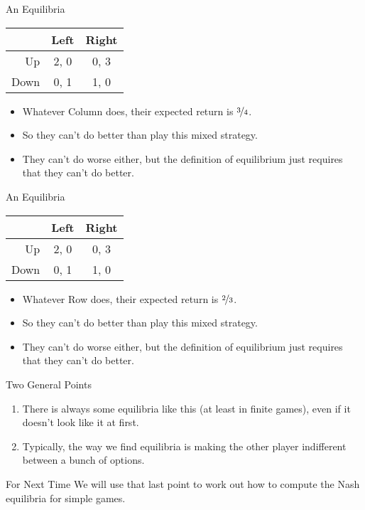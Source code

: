 \documentclass[
  ignorenonframetext,
]{beamer}
\providecommand{\tightlist}{%
  \setlength{\itemsep}{0pt}\setlength{\parskip}{0pt}}
\begin{document}
\begin{frame}{An Equilibria}
\protect\hypertarget{an-equilibria-1}{}
\begin{table}[!h]
\centering
\begin{tabular}[t]{>{}r|cc}
\toprule
 & Left & Right\\
\midrule
Up & 2, 0 & 0, 3\\
Down & 0, 1 & 1, 0\\
\bottomrule
\end{tabular}
\end{table}

\begin{itemize}
\tightlist
\item
  Whatever Column does, their expected return is \(\nicefrac{3}{4}\).
\item
  So they can't do better than play this mixed strategy.
\item
  They can't do worse either, but the definition of equilibrium just
  requires that they can't do better.
\end{itemize}
\end{frame}

\begin{frame}{An Equilibria}
\protect\hypertarget{an-equilibria-2}{}
\begin{table}[!h]
\centering
\begin{tabular}[t]{>{}r|cc}
\toprule
 & Left & Right\\
\midrule
Up & 2, 0 & 0, 3\\
Down & 0, 1 & 1, 0\\
\bottomrule
\end{tabular}
\end{table}

\begin{itemize}
\tightlist
\item
  Whatever Row does, their expected return is \(\nicefrac{2}{3}\).
\item
  So they can't do better than play this mixed strategy.
\item
  They can't do worse either, but the definition of equilibrium just
  requires that they can't do better.
\end{itemize}
\end{frame}

\begin{frame}{Two General Points}
\protect\hypertarget{two-general-points}{}
\begin{enumerate}[<+->]
\tightlist
\item
  There is always some equilibria like this (at least in finite games),
  even if it doesn't look like it at first.
\item
  Typically, the way we find equilibria is making the other player
  indifferent between a bunch of options.
\end{enumerate}
\end{frame}

\begin{frame}{For Next Time}
\protect\hypertarget{for-next-time}{}
We will use that last point to work out how to compute the Nash
equilibria for simple games.
\end{frame}
\end{document}
